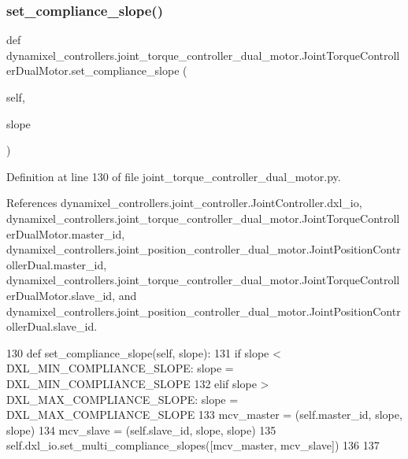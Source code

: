 \subsubsection{\texorpdfstring{set\+\_\+compliance\+\_\+slope()}{set\_compliance\_slope()}}
{\footnotesize\ttfamily def dynamixel\+\_\+controllers.\+joint\+\_\+torque\+\_\+controller\+\_\+dual\+\_\+motor.\+Joint\+Torque\+Controller\+Dual\+Motor.\+set\+\_\+compliance\+\_\+slope (\begin{DoxyParamCaption}\item[{}]{self,  }\item[{}]{slope }\end{DoxyParamCaption})}



Definition at line 130 of file joint\+\_\+torque\+\_\+controller\+\_\+dual\+\_\+motor.\+py.



References dynamixel\+\_\+controllers.\+joint\+\_\+controller.\+Joint\+Controller.\+dxl\+\_\+io, dynamixel\+\_\+controllers.\+joint\+\_\+torque\+\_\+controller\+\_\+dual\+\_\+motor.\+Joint\+Torque\+Controller\+Dual\+Motor.\+master\+\_\+id, dynamixel\+\_\+controllers.\+joint\+\_\+position\+\_\+controller\+\_\+dual\+\_\+motor.\+Joint\+Position\+Controller\+Dual.\+master\+\_\+id, dynamixel\+\_\+controllers.\+joint\+\_\+torque\+\_\+controller\+\_\+dual\+\_\+motor.\+Joint\+Torque\+Controller\+Dual\+Motor.\+slave\+\_\+id, and dynamixel\+\_\+controllers.\+joint\+\_\+position\+\_\+controller\+\_\+dual\+\_\+motor.\+Joint\+Position\+Controller\+Dual.\+slave\+\_\+id.


\begin{DoxyCode}
130     \textcolor{keyword}{def }set\_compliance\_slope(self, slope):
131         \textcolor{keywordflow}{if} slope < DXL\_MIN\_COMPLIANCE\_SLOPE: slope = DXL\_MIN\_COMPLIANCE\_SLOPE
132         \textcolor{keywordflow}{elif} slope > DXL\_MAX\_COMPLIANCE\_SLOPE: slope = DXL\_MAX\_COMPLIANCE\_SLOPE
133         mcv\_master = (self.master\_id, slope, slope)
134         mcv\_slave = (self.slave\_id, slope, slope)
135         self.dxl\_io.set\_multi\_compliance\_slopes([mcv\_master, mcv\_slave])
136 
137 
\end{DoxyCode}
\mbox{\label{classdynamixel__controllers_1_1joint__torque__controller__dual__motor_1_1_joint_torque_controller_dual_motor_ad10fda7d37dcce2101585315ccaa6d2c}} 
